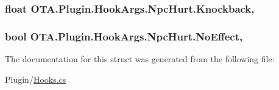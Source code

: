 \subsubsection[{Knockback}]{\setlength{\rightskip}{0pt plus 5cm}float O\+T\+A.\+Plugin.\+Hook\+Args.\+Npc\+Hurt.\+Knockback\hspace{0.3cm}{\ttfamily [get]}, {\ttfamily [set]}}\label{struct_o_t_a_1_1_plugin_1_1_hook_args_1_1_npc_hurt_a215178a2245002fc1203ffaa43f22ff2}
\hypertarget{struct_o_t_a_1_1_plugin_1_1_hook_args_1_1_npc_hurt_ab722724d6e83f577ddc8588eb351e377}{}
\subsubsection[{No\+Effect}]{\setlength{\rightskip}{0pt plus 5cm}bool O\+T\+A.\+Plugin.\+Hook\+Args.\+Npc\+Hurt.\+No\+Effect\hspace{0.3cm}{\ttfamily [get]}, {\ttfamily [set]}}\label{struct_o_t_a_1_1_plugin_1_1_hook_args_1_1_npc_hurt_ab722724d6e83f577ddc8588eb351e377}


The documentation for this struct was generated from the following file\+:\begin{DoxyCompactItemize}
\item 
Plugin/\hyperlink{_hooks_8cs}{Hooks.\+cs}\end{DoxyCompactItemize}
